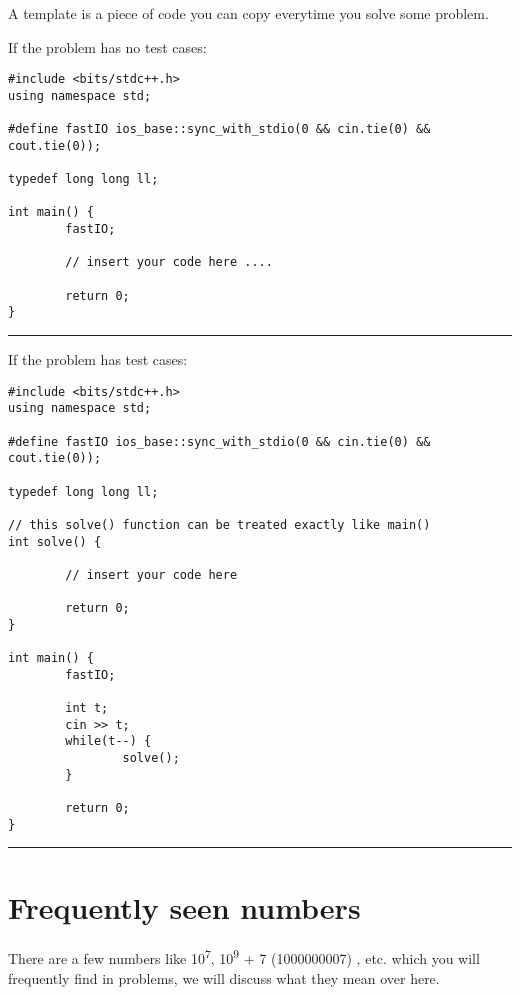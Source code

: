 \documentclass[13pt, oneside, a4paper]{book}
\begin{document}
A template is a piece of code you can copy everytime you solve some problem.
\smallskip

If the  problem has no test cases:
\begin{verbatim}
#include <bits/stdc++.h>
using namespace std;

#define fastIO ios_base::sync_with_stdio(0 && cin.tie(0) && cout.tie(0));

typedef long long ll;

int main() {
        fastIO;

        // insert your code here ....
        
        return 0;
}
\end{verbatim}

\hrule
\bigskip

If the problem has test cases:

\begin{verbatim}
#include <bits/stdc++.h>
using namespace std;

#define fastIO ios_base::sync_with_stdio(0 && cin.tie(0) && cout.tie(0));

typedef long long ll;

// this solve() function can be treated exactly like main()
int solve() {
        
        // insert your code here
        
        return 0;
}

int main() {
        fastIO;

        int t;
        cin >> t;
        while(t--) {
                solve();
        }
        
        return 0;
}
\end{verbatim}

\hrule\bigskip

\section{Frequently seen numbers}

There are a few numbers like 10\textsuperscript{7}, 10\textsuperscript{9} + 7 (1000000007) , etc. which you
will frequently find in problems, we will discuss what they mean over here.
\end{document}
